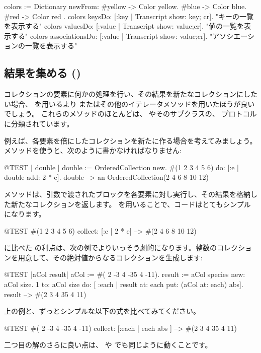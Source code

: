 \documentclass[a4paper,10pt,twoside]{book}
\begin{document}
\begin{code}{}
colors := Dictionary newFrom: { #yellow -> Color yellow. #blue -> Color blue. #red -> Color red }.
colors keysDo: [:key | Transcript show: key; cr].                    "キーの一覧を表示する"
colors valuesDo: [:value | Transcript show: value;cr].            "値の一覧を表示する"
colors associationsDo: [:value | Transcript show: value;cr].  "アソシエーションの一覧を表示する"
\end{code}

\subsection{結果を集める ()}
コレクションの要素に何かの処理を行い、その結果を新たなコレクションにしたい場合、 を用いるより またはその他のイテレータメソッドを用いたほうが良いでしょう。
これらのメソッドのほとんどは、 やそのサブクラスの、 プロトコルに分類されています。

例えば、各要素を倍にしたコレクションを新たに作る場合を考えてみましょう。 メソッドを使うと、次のように書かなければなりません:

\begin{code}{@TEST | double |}
double := OrderedCollection new.
#(1 2 3 4 5 6) do: [:e | double add: 2 * e].
double --> an OrderedCollection(2 4 6 8 10 12)
\end{code}

\noindent
{} メソッドは、引数で渡されたブロックを各要素に対し実行し、その結果を格納した新たなコレクションを返します。
 を用いることで、コードはとてもシンプルになります。
\begin{code}{@TEST}
#(1 2 3 4 5 6) collect: [:e | 2 * e] --> #(2 4 6 8 10 12)
\end{code}

 に比べた  の利点は、次の例でよりいっそう劇的になります。整数のコレクションを用意して、その絶対値からなるコレクションを生成します:

\begin{code}{@TEST |aCol result|}
aCol :=  #( 2 -3 4 -35 4 -11).
result := aCol species new: aCol size.
1 to: aCol size do: [ :each | result at: each put: (aCol at: each) abs].
result --> #(2 3 4 35 4 11)
\end{code}
\noindent
上の例と、ずっとシンプルな以下の式を比べてみてください。
\begin{code}{@TEST}
#( 2 -3 4 -35 4 -11) collect: [:each | each abs ] --> #(2 3 4 35 4 11)
\end{code}
\noindent
二つ目の解のさらに良い点は、 や  でも同じように動くことです。
\end{document}
